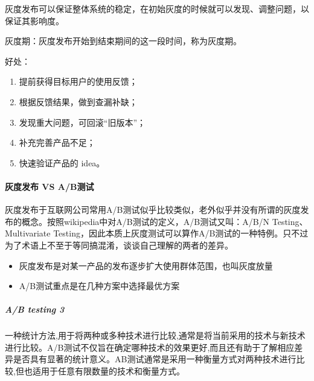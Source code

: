 \documentclass[letterpaper,10pt,english]{sphinxmanual}
\begin{document}
灰度发布可以保证整体系统的稳定，在初始灰度的时候就可以发现、调整问题，以保证其影响度。

灰度期：灰度发布开始到结束期间的这一段时间，称为灰度期。

好处：
\begin{enumerate}
%
\item {} 
提前获得目标用户的使用反馈；

\item {} 
根据反馈结果，做到查漏补缺；

\item {} 
发现重大问题，可回滚“旧版本”；

\item {} 
补充完善产品不足；

\item {} 
快速验证产品的 idea。

\end{enumerate}


\paragraph{灰度发布 VS A/B测试}
\label{\detokenize{chapter_AI_dive/huidu:vs-a-b}}
灰度发布于互联网公司常用A/B测试似乎比较类似，老外似乎并没有所谓的灰度发布的概念。按照wikipedia中对A/B测试的定义，A/B测试又叫：A/B/N
Testing、Multivariate
Testing，因此本质上灰度测试可以算作A/B测试的一种特例。只不过为了术语上不至于等同搞混淆，谈谈自己理解的两者的差异。
\begin{itemize}
\item {} 
灰度发布是对某一产品的发布逐步扩大使用群体范围，也叫灰度放量

\item {} 
A/B测试重点是在几种方案中选择最优方案%
\begin{footnote}[976]\sphinxAtStartFootnote
{}
%
\end{footnote}

\end{itemize}


\subparagraph{A/B testing 3\sphinxfootnotemark[977]}
\label{\detokenize{chapter_AI_dive/huidu:a-b-testing-3}}%
\begin{footnotetext}[977]\sphinxAtStartFootnote
{}
%
\end{footnotetext}\ignorespaces 
一种统计方法,用于将两种或多种技术进行比较,通常是将当前采用的技术与新技术进行比较。A/B测试不仅旨在确定哪种技术的效果更好,而且还有助于了解相应差异是否具有显著的统计意义。AB测试通常是采用一种衡量方式对两种技术进行比较,但也适用于任意有限数量的技术和衡量方式。
\end{document}
